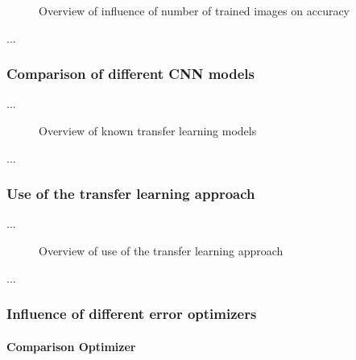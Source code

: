 \documentclass[10pt]{article}
\begin{document}
				\begin{figure}[H]
					\begin{center}
						
					\end{center}
					\caption{Overview of influence of number of trained images on accuracy}
					\label{fig:evaluation_number_train_files}
				\end{figure}

				\noindent ...
		
			\subsubsection{Comparison of different CNN models}

				\noindent ...

				\begin{figure}[H]
					\begin{center}
						
					\end{center}
					\caption{Overview of known transfer learning models}
					\label{fig:evaluation_different_models}
				\end{figure}

				\noindent ...
		
			\subsubsection{Use of the transfer learning approach}
			\label{sec:section_use_of_the_transfer_learning_approach}
	
				\noindent ...

				\begin{figure}[H]
					\begin{center}
						
					\end{center}
					\caption{Overview of use of the transfer learning approach}
					\label{fig:evaluation_transfer_learning}
				\end{figure}

				\noindent ...

			\subsubsection{Influence of different error optimizers}

				\paragraph{Comparison Optimizer}
\end{document}
